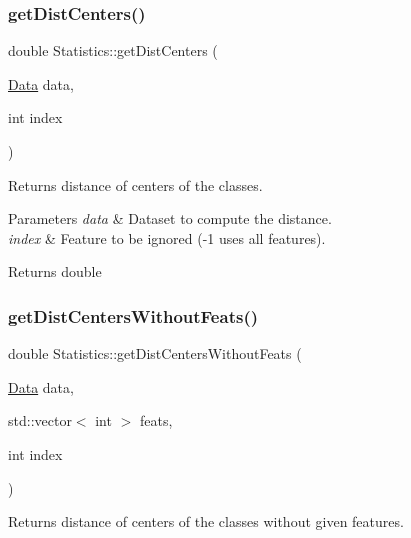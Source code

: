 \subsubsection{\texorpdfstring{get\+Dist\+Centers()}{getDistCenters()}}
{\footnotesize\ttfamily double Statistics\+::get\+Dist\+Centers (\begin{DoxyParamCaption}\item[{\hyperlink{class_data}{Data}}]{data,  }\item[{int}]{index }\end{DoxyParamCaption})\hspace{0.3cm}{\ttfamily [static]}}



Returns distance of centers of the classes. 


\begin{DoxyParams}{Parameters}
{\em data} & Dataset to compute the distance. \\
\hline
{\em index} & Feature to be ignored (-\/1 uses all features). \\
\hline
\end{DoxyParams}
\begin{DoxyReturn}{Returns}
double 
\end{DoxyReturn}
\mbox{\label{class_statistics_a705f3b85e91f08f926670c6602fffda6}} 
\subsubsection{\texorpdfstring{get\+Dist\+Centers\+Without\+Feats()}{getDistCentersWithoutFeats()}}
{\footnotesize\ttfamily double Statistics\+::get\+Dist\+Centers\+Without\+Feats (\begin{DoxyParamCaption}\item[{\hyperlink{class_data}{Data}}]{data,  }\item[{std\+::vector$<$ int $>$}]{feats,  }\item[{int}]{index }\end{DoxyParamCaption})\hspace{0.3cm}{\ttfamily [static]}}



Returns distance of centers of the classes without given features. 


